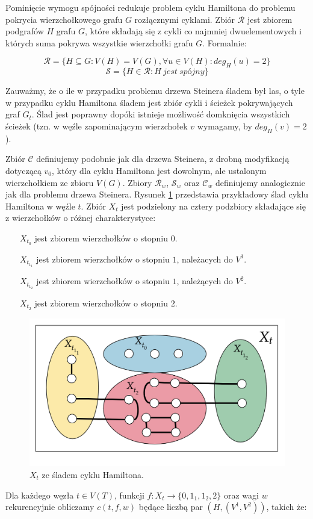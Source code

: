 \documentclass[12pt, oneside]{report}
\begin{document}
Pominięcie wymogu spójności redukuje problem cyklu Hamiltona do problemu pokrycia wierzchołkowego grafu $G$ rozłącznymi cyklami. Zbiór $\mathcal{R}$ jest zbiorem podgrafów $H$ grafu $G$, które składają się z cykli co najmniej dwuelementowych i których suma pokrywa wszystkie wierzchołki grafu $G$. Formalnie:

$$\mathcal{R} = \{H \subseteq G: V(H) = V(G), \forall u \in V(H): deg_H(u) = 2\}$$
$$\mathcal{S} = \{H \in \mathcal{R}: H\ jest\ sp\mbox{ó}jny\}$$

Zauważmy, że o ile w przypadku problemu drzewa Steinera śladem był las, o tyle w przypadku cyklu Hamiltona śladem jest zbiór cykli i ścieżek pokrywających graf $G_t$. Ślad jest poprawny dopóki istnieje możliwość domknięcia wszystkich ścieżek (tzn. w węźle zapominającym wierzchołek $v$ wymagamy, by $deg_H(v) = 2$).

Zbiór $\mathcal{C}$ definiujemy podobnie jak dla drzewa Steinera, z drobną modyfikacją dotyczącą $v_0$, który dla cyklu Hamiltona jest dowolnym, ale ustalonym wierzchołkiem ze zbioru $V(G)$. Zbiory $\mathcal{R}_w$, $\mathcal{S}_w$ oraz $\mathcal{C}_w$ definiujemy analogicznie jak dla problemu drzewa Steinera. Rysunek \ref{cnc_hamiltonian} przedstawia przykładowy ślad cyklu Hamiltona w węźle $t$. Zbiór $X_t$ jest podzielony na cztery podzbiory składające się z wierzchołków o różnej charakterystyce:
\addtolength{\leftmargini}{3cm}
\begin{itemize}[noitemsep,topsep=5pt,parsep=0pt,partopsep=0pt]
\item[$X_{t_0}$ ] jest zbiorem wierzchołków o stopniu $0$.
\item[$X_{t_{1_1}}$] jest zbiorem wierzchołków o stopniu $1$, należacych do $V^1$.
\item[$X_{t_{1_2}}$] jest zbiorem wierzchołków o stopniu $1$, należących do $V^2$.
\item[$X_{t_2}$ ] jest zbiorem wierzchołków o stopniu $2$.
\end{itemize}
\addtolength{\leftmargini}{-3cm}
\begin{figure}
\centering
\label{cnc_hamiltonian}
\includegraphics[width=16cm]{cnc_hamiltonian.png}
\caption{$X_t$ ze śladem cyklu Hamiltona.}
\end{figure}
\noindent Dla każdego węzła $t \in V(T)$, funkcji $f: X_t \to \{0,1_1,1_2,2\}$ oraz wagi $w$ rekurencyjnie obliczamy $c(t,f,w)$ będące liczbą par $(H, (V^1, V^2))$, takich że:
\end{document}
